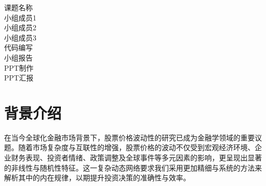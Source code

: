 \documentclass{article} %
\begin{document}
\begin{titlepage}
\begin{center}
          \large 课题名称\hspace{0.8cm}\underline{} \\
          \vspace{0.2cm}
            \large 小组成员1\hspace{0.5cm}\underline{} \\
            \vspace{0.2cm}
            \large 小组成员2\hspace{0.5cm}\underline{} \\
            \vspace{0.2cm}
            \large 小组成员3\hspace{0.5cm}\underline{} \\  
            \vspace{0.2cm} 
            \large 代码编写\hspace{0.9cm}\underline{} \\  
            \vspace{0.2cm} 
            \large 小组报告\hspace{0.9cm}\underline{} \\  
            \vspace{0.2cm} 
            \large PPT制作\hspace{0.9cm}\underline{} \\  
            \vspace{0.2cm}
            \large PPT汇报\hspace{0.9cm}\underline{} \\  
            \vspace{2.5cm}
            \Large {}
        \end{center}
\end{titlepage}

\clearpage %


\tableofcontents
\listoffigures
\listoftables
\newpage

\section{背景介绍}

在当今全球化金融市场背景下，股票价格波动性的研究已成为金融学领域的重要议题。随着市场复杂度与互联性的增强，股票价格的波动不仅受到宏观经济环境、企业财务表现、投资者情绪、政策调整及全球事件等多元因素的影响，更呈现出显著的非线性与随机性特征。这一复杂动态网络要求我们采用更加精细与系统的方法来解析其中的内在规律，以期提升投资决策的准确性与效率。
\end{document}
